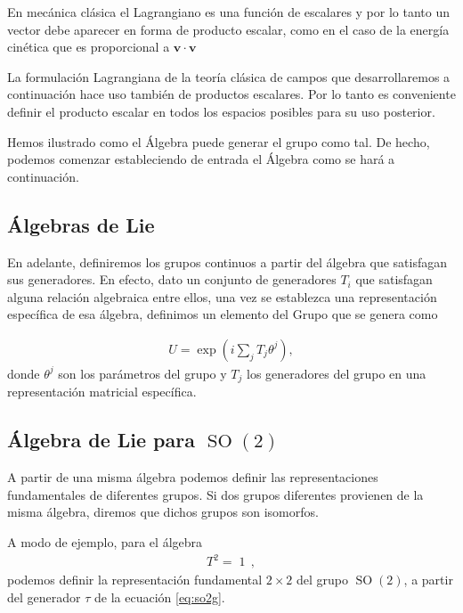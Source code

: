\begin{frame}
  En mecánica clásica el Lagrangiano es una función de escalares y por lo tanto un vector debe aparecer en forma de producto escalar, como en el caso de la energía cinética que es proporcional a $\boldsymbol{v}\cdot \boldsymbol{v}$
\end{frame}

La formulación Lagrangiana de la teoría clásica de campos que desarrollaremos a continuación hace uso también de productos escalares. Por lo tanto es conveniente definir el producto escalar en todos los espacios posibles para su uso posterior.


Hemos ilustrado como el Álgebra puede generar el grupo como tal. De hecho, podemos comenzar estableciendo de entrada el Álgebra como se hará a continuación.

\subsection{Álgebras de Lie}
En adelante, definiremos los grupos continuos a partir del álgebra que satisfagan sus generadores. En efecto, dato un conjunto de generadores $T_{i}$ que satisfagan alguna relación algebraica entre ellos, una vez se establezca una representación específica de esa álgebra, definimos un elemento del Grupo que se genera como
%
\begin{frame}

\begin{align}
  U=\exp \left( i \sum_j T_j \theta^{j} \right),
\end{align}
donde $\theta^j$ son los parámetros del grupo y $T_j$ los generadores del grupo en una representación matricial específica.
\end{frame}

\subsection{Álgebra de Lie para $\operatorname{SO}(2)$}
A partir de una misma álgebra podemos definir las representaciones fundamentales de diferentes grupos. Si dos grupos diferentes provienen de la misma álgebra, diremos que dichos grupos son isomorfos.

A modo de ejemplo, para el álgebra
\begin{align}
  \label{eq:algab}
  T^2=\operatorname{1}\,,
\end{align}
podemos definir la representación fundamental $2\times2$ del grupo $\operatorname{SO}(2)$, a partir del generador $\tau$ de la ecuación \eqref{eq:so2g}. 

